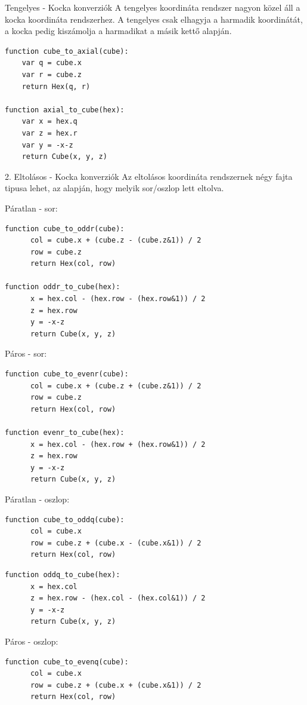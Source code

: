 Tengelyes - Kocka konverziók
A tengelyes koordináta rendszer nagyon közel áll a kocka koordináta rendszerhez. A tengelyes csak elhagyja a harmadik koordinátát, a kocka pedig kiszámolja a harmadikat a másik kettő alapján.

\begin{verbatim}
function cube_to_axial(cube):
    var q = cube.x
    var r = cube.z
    return Hex(q, r)

function axial_to_cube(hex):
    var x = hex.q
    var z = hex.r
    var y = -x-z
    return Cube(x, y, z)
\end{verbatim}

2. Eltolásos - Kocka konverziók
Az eltolásos koordináta rendszernek négy fajta tipusa lehet, az alapján, hogy melyik sor/oszlop lett eltolva.

Páratlan - sor:

\begin{verbatim}
function cube_to_oddr(cube):
      col = cube.x + (cube.z - (cube.z&1)) / 2
      row = cube.z
      return Hex(col, row)

function oddr_to_cube(hex):
      x = hex.col - (hex.row - (hex.row&1)) / 2
      z = hex.row
      y = -x-z
      return Cube(x, y, z)
\end{verbatim}

Páros - sor:

\begin{verbatim}
function cube_to_evenr(cube):
      col = cube.x + (cube.z + (cube.z&1)) / 2
      row = cube.z
      return Hex(col, row)

function evenr_to_cube(hex):
      x = hex.col - (hex.row + (hex.row&1)) / 2
      z = hex.row
      y = -x-z
      return Cube(x, y, z)
\end{verbatim}      
      
Páratlan - oszlop:

\begin{verbatim}
function cube_to_oddq(cube):
      col = cube.x
      row = cube.z + (cube.x - (cube.x&1)) / 2
      return Hex(col, row)
\end{verbatim}

\begin{verbatim}
function oddq_to_cube(hex):
      x = hex.col
      z = hex.row - (hex.col - (hex.col&1)) / 2
      y = -x-z
      return Cube(x, y, z)
\end{verbatim}

Páros - oszlop:

\begin{verbatim}
function cube_to_evenq(cube):
      col = cube.x
      row = cube.z + (cube.x + (cube.x&1)) / 2
      return Hex(col, row)
\end{verbatim}

